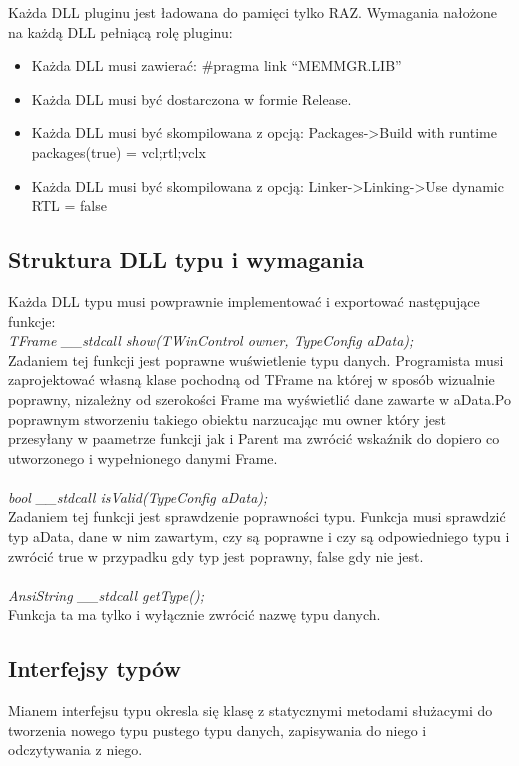 Każda DLL pluginu jest ładowana do pamięci tylko RAZ.
Wymagania nałożone na każdą DLL pełniącą rolę pluginu:
\begin{itemize}
\item Każda DLL musi zawierać: \#pragma link ``MEMMGR.LIB''
\item Każda DLL musi być dostarczona w formie Release.
\item Każda DLL musi być skompilowana z opcją: Packages->Build with runtime packages(true) = vcl;rtl;vclx
\item Każda DLL musi być skompilowana z opcją: Linker->Linking->Use dynamic RTL = false
\end{itemize}
\subsection{Struktura DLL typu i wymagania}
Każda DLL typu musi powprawnie implementować i exportować następujące funkcje:\\
\textit{TFrame\* \_\_stdcall show(TWinControl\* owner, TypeConfig\* aData);}\\
Zadaniem tej funkcji jest poprawne wuświetlenie typu danych. Programista musi zaprojektować własną klase pochodną od TFrame na której w sposób wizualnie poprawny, nizależny od szerokości Frame ma wyświetlić dane zawarte w aData.Po poprawnym stworzeniu takiego obiektu narzucając mu owner który jest przesyłany w paametrze funkcji jak i Parent ma zwrócić wskaźnik do dopiero co utworzonego i wypełnionego danymi Frame.\\\\

\textit{bool \_\_stdcall isValid(TypeConfig\* aData);}\\
Zadaniem tej funkcji jest sprawdzenie poprawności typu. Funkcja musi sprawdzić typ aData, dane w nim zawartym, czy są poprawne i czy są odpowiedniego typu i zwrócić true w przypadku gdy typ jest poprawny, false gdy nie jest.\\\\
\textit{AnsiString \_\_stdcall getType();}\\
Funkcja ta ma tylko i wyłącznie zwrócić nazwę typu danych.

\subsection{Interfejsy typów}
Mianem interfejsu typu okresla się klasę z statycznymi metodami służacymi do tworzenia nowego typu pustego typu danych, zapisywania do niego i odczytywania z niego.
